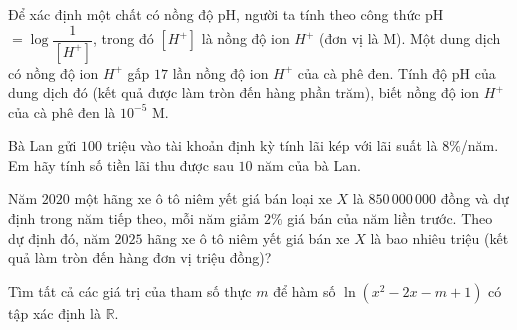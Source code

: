 \begin{bt}%

	Để xác định một chất có nồng độ pH, người ta tính theo công thức pH$=\log\dfrac{1}{\left[H^+\right]}$, trong đó $\left[H^+\right]$ là nồng độ ion $H^+$ (đơn vị là M). Một dung dịch có nồng độ ion $H^+$ gấp $17$ lần nồng độ ion $H^+$ của cà phê đen. Tính độ pH của dung dịch đó (kết quả được làm tròn đến hàng phần trăm), biết nồng độ ion $H^+$ của cà phê đen là $10^{-5}$ M.
\end{bt}

\begin{bt}%
	Bà Lan gửi $100$ triệu vào tài khoản định kỳ tính lãi kép với lãi suất là $8$\%/năm. Em hãy tính số tiền lãi thu được sau $10$ năm của bà Lan.
\end{bt}

\begin{bt}%

	Năm $2020$ một hãng xe ô tô niêm yết giá bán loại xe $X$ là $850\,000\,000$ đồng và dự định trong năm tiếp theo, mỗi năm giảm $2\%$ giá bán của năm liền trước. Theo dự định đó, năm $2025$ hãng xe ô tô niêm yết giá bán xe $X$ là bao nhiêu triệu (kết quả làm tròn đến hàng đơn vị triệu đồng)? 
\end{bt}

\begin{bt}%

	Tìm tất cả các giá trị của tham số thực $m$ để hàm số $\ln\left(x^2-2x-m+1\right)$ có tập xác định là $\mathbb{R}$.
\end{bt}

